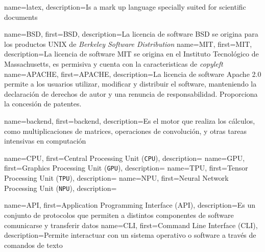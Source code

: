 \makeglossaries


    {name={latex},      description={Is a mark up language specially suited for scientific documents}}

      {name={BSD},    first={BSD},    description={La licencia de software BSD se origina para los productos UNIX de \textit{Berkeley Software Distribution}}}
      {name={MIT},    first={MIT},    description={La licencia de software MIT se origina en el Instituto Tecnológico de Massachusetts, es permisiva y cuenta con la caracteristicas de \textit{copyleft}}}
 {name={APACHE}, first={APACHE}, description={La licencia de software Apache 2.0 permite a los usuarios utilizar, modificar y distribuir el software, manteniendo la declaración de derechos de autor y una renuncia de responsabilidad. Proporciona la concesión de patentes.}}


 {name={backend}, first={backend}, description={Es el motor que realiza los cálculos, como multiplicaciones de matrices, operaciones de convolución, y otras tareas intensivas en computación}}


   {name={CPU},     first={Central Processing Unit (\texttt{CPU})},        description={}}
   {name={GPU},     first={Graphics Processing Unit (\texttt{GPU})},       description={}}
   {name={TPU},     first={Tensor Processing Unit (\texttt{TPU})},         description={}}
   {name={NPU},     first={Neural Network Processing Unit (\texttt{NPU})}, description={}}



   {name={API},     first={Application Programming Interface (API)}, description={Es un conjunto de protocolos que permiten a distintos componentes de software comunicarse y transferir datos}}
   {name={CLI},     first={Command Line Interface (CLI)}, description={Permite interactuar con un sistema operativo o software a través de comandos de texto}}

